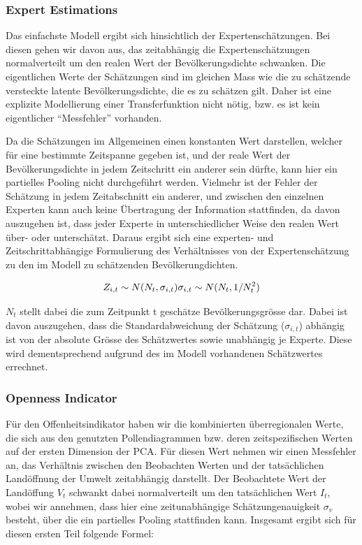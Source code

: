 \documentclass[
]{article}
\begin{document}
\hypertarget{expert-estimations}{%
\subsubsection{Expert Estimations}\label{expert-estimations}}

Das einfachste Modell ergibt sich hinsichtlich der Expertenschätzungen. Bei diesen gehen wir davon aus, das zeitabhängig die Expertenschätzungen normalverteilt um den realen Wert der Bevölkerungsdichte schwanken. Die eigentlichen Werte der Schätzungen sind im gleichen Mass wie die zu schätzende versteckte latente Bevölkerungsdichte, die es zu schätzen gilt. Daher ist eine explizite Modellierung einer Transferfunktion nicht nötig, bzw. es ist kein eigentlicher ``Messfehler'' vorhanden.

Da die Schätzungen im Allgemeinen einen konstanten Wert darstellen, welcher für eine bestimmte Zeitspanne gegeben ist, und der reale Wert der Bevölkerungsdichte in jedem Zeitschritt ein anderer sein dürfte, kann hier ein partielles Pooling nicht durchgeführt werden. Vielmehr ist der Fehler der Schätzung in jedem Zeitabschnitt ein anderer, und zwischen den einzelnen Experten kann auch keine Übertragung der Information stattfinden, da davon auszugehen ist, dass jeder Experte in unterschiedlicher Weise den realen Wert über- oder unterschätzt. Daraus ergibt sich eine experten- und Zeitschrittabhängige Formulierung des Verhältnisses von der Expertenschätzung zu den im Modell zu schätzenden Bevölkerungdichten.

\[
Z_{i, t} \sim N(N_t, \sigma_{i, t}) \\
\sigma_{i, t} \sim N(N_t, 1/N_t^2)
\]

\(N_t\) stellt dabei die zum Zeitpunkt t geschätze Bevölkerungsgrösse dar. Dabei ist davon auszugehen, dass die Standardabweichung der Schätzung (\(\sigma_{i,t}\)) abhängig ist von der absolute Grösse des Schätzwertes sowie unabhängig je Experte. Diese wird dementsprechend aufgrund des im Modell vorhandenen Schätzwertes errechnet.

\hypertarget{openness-indicator}{%
\subsubsection{Openness Indicator}\label{openness-indicator}}

Für den Offenheitsindikator haben wir die kombinierten überregionalen Werte, die sich aus den genutzten Pollendiagrammen bzw. deren zeitspezifischen Werten auf der ersten Dimension der PCA. Für diesen Wert nehmen wir einen Messfehler an, das Verhältnis zwischen den Beobachten Werten und der tatsächlichen Landöffnung der Umwelt zeitabhängig darstellt. Der Beobachtete Wert der Landöffung \(V_t\) schwankt dabei normalverteilt um den tatsächlichen Wert \(I_t\), wobei wir annehmen, dass hier eine zeitunabhängige Schätzungenauigkeit \(\sigma_v\) besteht, über die ein partielles Pooling stattfinden kann. Insgesamt ergibt sich für diesen ersten Teil folgende Formel:
\end{document}
